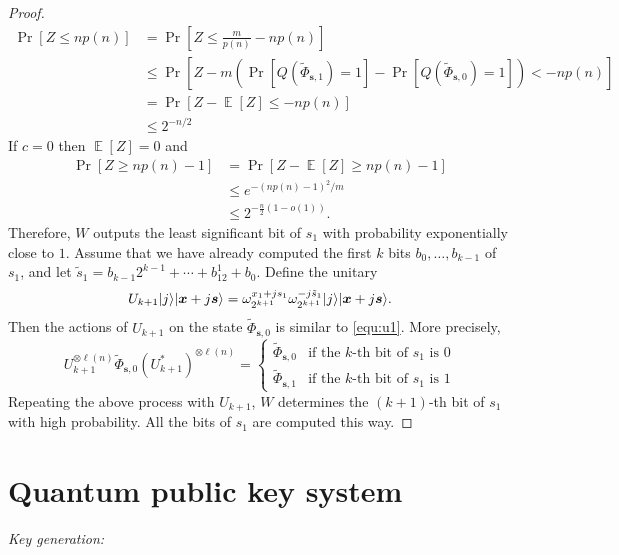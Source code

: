 \documentclass[11pt]{article}
\theoremstyle{plain}
\theoremstyle{definition}
\DeclareMathOperator{\E}{\mathbb{E}}
\DeclarePairedDelimiter{\ldbrac}{\lvert}{\rangle}
\begin{document}
\begin{proof}
    \begin{align*}
        \Pr[ Z \le np(n) ]
        & = \Pr[ Z \le \frac{m}{p(n)} - np(n) ] \\
        & \le \Pr[ Z - m(\Pr[ Q(\tilde{\Phi}_{\bm{s}, 1}) = 1 ] - \Pr[ Q(\tilde{\Phi}_{\bm{s}, 0}) = 1]) < -np(n) ] \\
        & = \Pr[ Z - \E[Z] \le -np(n) ] \\
        & \le 2^{-n / 2}
    \end{align*}
    If $c = 0$ then $\E[Z] = 0$ and
    \begin{align*}
        \Pr[ Z \ge np(n) - 1 ]
        & = \Pr[ Z -\E[Z] \ge np(n) - 1 ] \\
        & \le e^{-(np(n) - 1)^2 / m} \\
        & \le 2^{-\frac{n}{2}(1 - o(1))}.
    \end{align*}
    Therefore, $W$ outputs the least significant bit of $s_1$ with probability exponentially close to $1$. Assume that we have already computed the first $k$ bits $b_0, \dots, b_{k - 1}$ of $s_1$, and let $\tilde{s}_1 = b_{k - 1}2^{k - 1} + \cdots + b_12^1 + b_0$. Define the unitary
    \[ U_{k + 1} \ldbrac{j}\ldbrac{\bm{x} + j\bm{s}} = \omega_{2^{k + 1}}^{x_1 + js_1} \omega_{2^{k + 1}}^{-j\tilde{s}_1} \ldbrac{j}\ldbrac{\bm{x} + j\bm{s}}. \]
    Then the actions of $U_{k + 1}$ on the state $\tilde{\Phi}_{\bm{s}, 0}$ is similar to \eqref{equ:u1}. More precisely,
    \[
    U_{k + 1}^{\otimes \ell(n)} \tilde{\Phi}_{\bm{s}, 0} (U_{k + 1}^*)^{\otimes \ell(n)} =
    \begin{cases}
        \tilde{\Phi}_{\bm{s}, 0} & \text{if the } k\text{-th bit of } s_1 \text{ is } 0 \\
        \tilde{\Phi}_{\bm{s}, 1} & \text{if the } k\text{-th bit of } s_1 \text{ is } 1
    \end{cases}
    \]
    Repeating the above process with $U_{k + 1}$, $W$ determines the $(k + 1)$-th bit of $s_1$ with high probability. All the bits of $s_1$ are computed this way.
\end{proof}






\section{Quantum public key system}


\textit{Key generation:}
\end{document}
